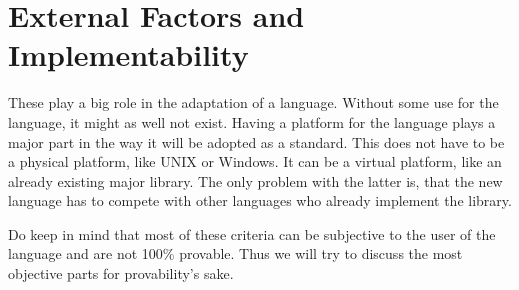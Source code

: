 \section{External Factors and Implementability}
These play a big role in the adaptation of a language.
Without some use for the language, it might as well not exist.
Having a platform for the language plays a major part in the way it will be adopted as a standard.
This does not have to be a physical platform, like UNIX or Windows.
It can be a virtual platform, like an already existing major library.
The only problem with the latter is, that the new language has to compete with other languages who already implement the library.

\bigskip

Do keep in mind that most of these criteria can be subjective to the user of the language and are not 100\% provable.
Thus we will try to discuss the most objective parts for provability's sake.
